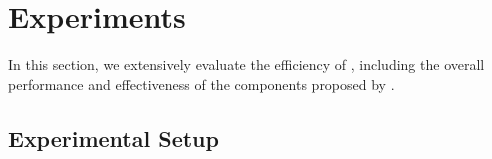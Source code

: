 \section{Experiments}
\label{sec:experiment}
\label{sec:evaluation}

In this section, we extensively evaluate the efficiency of \system, including the overall performance and effectiveness of the components proposed by \system.


\subsection{Experimental Setup}

